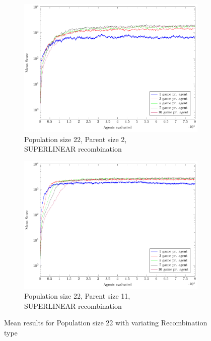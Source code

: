 \begin{figure}
\begin{subfigure}[b]{0.49\textwidth}
    \end{subfigure}
    \begin{subfigure}[b]{0.49\textwidth}
    	\centering
    	\caption{Population size 22, Parent size 2,\\SUPERLINEAR recombination}
        \includegraphics[width=\textwidth]{data/cma_population_offspring/22x_split/superlinear_l22_o2/mean/PlotFile.pdf}
    \end{subfigure}
    \begin{subfigure}[b]{0.49\textwidth}
    	\centering
    	\caption{Population size 22, Parent size 11,\\SUPERLINEAR recombination}
        \includegraphics[width=\textwidth]{data/cma_population_offspring/22x_split/superlinear_l22_o11/mean/PlotFile.pdf}
    \end{subfigure}
    
    \caption{Mean results for Population size 22 with variating Recombination type}
\end{figure}


